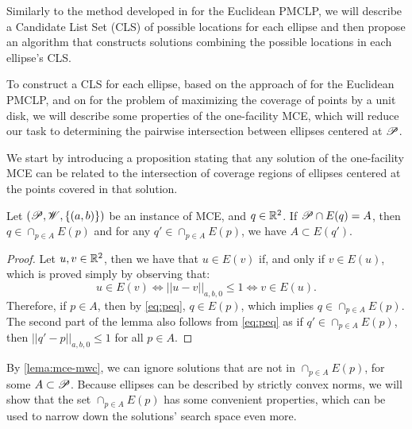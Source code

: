 Similarly to the method developed in \cite{church:1984} for the Euclidean PMCLP, we will describe a Candidate List Set (CLS) of possible locations for each ellipse and then propose an algorithm that constructs solutions combining the possible locations in each ellipse's CLS.

To construct a CLS for each ellipse, based on the approach of \cite{church:1984} for the Euclidean PMCLP, and on \cite{chazelle:1986} for the problem of maximizing the coverage of points by a unit disk, we will describe some properties of the one-facility MCE, which will reduce our task to determining the pairwise intersection between ellipses centered at $\mathscr{P}$.


We start by introducing a proposition stating that any solution of the one-facility MCE can be related to the intersection of coverage regions of ellipses centered at the points covered in that solution.

\begin{prp}\label{lema:mce-mwc}
	Let $(\mathscr{P}, \mathscr{W}, \{(a, b)\})$ be an instance of MCE, and $q\in \mathbb{R}^2$. If $\mathscr{P} \cap E(q) = A$, then $q \in \cap_{p\in A} E(p)$ and for any $q' \in \cap_{p\in A} E(p)$, we have $A \subset E(q')$.
\end{prp}
\begin{proof}
	Let $u, v \in \mathbb{R}^2$, then we have that $u \in E(v)$ if, and only if $v \in E(u)$, which is proved simply by observing that:
	\begin{equation}\label{eq:peq}
	u \in E(v) \Leftrightarrow ||u-v||_{a, b, 0} \le 1 \Leftrightarrow v \in E(u).
	\end{equation}
	Therefore, if $p\in A$, then by \autoref{eq:peq}, $q \in E(p)$, which implies $q \in \cap_{p\in A} E(p)$.
	The second part of the lemma also follows from \autoref{eq:peq} as if $q' \in \cap_{p\in A} E(p)$, then $||q' - p||_{a,b,0} \le 1$ for all $p \in A$.
\end{proof}

By \autoref{lema:mce-mwc}, we can ignore solutions that are not in $\cap_{p\in A} E(p)$, for some $A \subset \mathscr{P}$. Because ellipses can be described by strictly convex norms, we will show that the set $\cap_{p\in A} E(p)$ has some convenient properties, which can be used to narrow down the solutions' search space even more.

